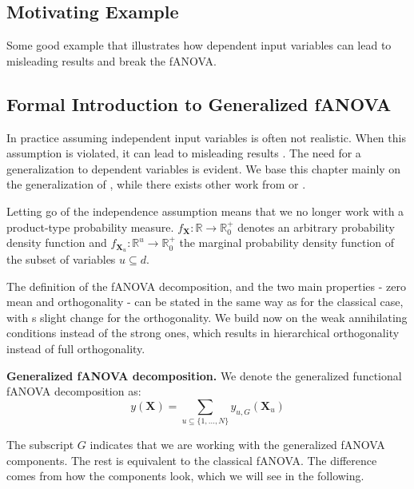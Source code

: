 \subsection{Motivating Example}
Some good example that illustrates how dependent input variables can lead to misleading results and break the fANOVA.
\subsection{Formal Introduction to Generalized fANOVA}
In practice assuming independent input variables is often not realistic. When this assumption is violated, it can lead to misleading results \citep{hooker2007}. The need for a generalization to dependent variables is evident. We base this chapter mainly on the generalization of \cite{rahman2014}, while there exists other work from \cite{hooker2007} or \cite{chastaing2012}.\par

Letting go of the independence assumption means that we no longer work with a product-type probability measure. $f_{\boldsymbol{X}}: \mathbb{R} \rightarrow \mathbb{R}_{0}^{+}$ denotes an arbitrary probability density function and $f_{\boldsymbol{X}_u}: \mathbb{R}^u \rightarrow \mathbb{R}_{0}^{+}$ the marginal probability density function of the subset of variables $u \subseteq d$.\par

The definition of the fANOVA decomposition, and the two main properties - zero mean and orthogonality - can be stated in the same way as for the classical case, with s slight change for the orthogonality. We build now on the weak annihilating conditions instead of the strong ones, which results in hierarchical orthogonality instead of full orthogonality.\par

\begin{definition}
    \textbf{Generalized fANOVA decomposition.}
    We denote the generalized functional fANOVA decomposition as:
    \begin{equation}
        y(\boldsymbol{X}) = \sum_{u \subseteq \{1, \dots, N\}} y_{u, G}(\boldsymbol{X}_u)
    \end{equation}
\end{definition}
The subscript $G$ indicates that we are working with the generalized fANOVA components. The rest is equivalent to the classical fANOVA. The difference comes from how the components look, which we will see in the following. 


